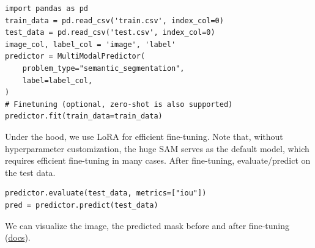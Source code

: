 \begin{verbatim}
import pandas as pd
train_data = pd.read_csv('train.csv', index_col=0)
test_data = pd.read_csv('test.csv', index_col=0)
image_col, label_col = 'image', 'label'
predictor = MultiModalPredictor(
    problem_type="semantic_segmentation", 
    label=label_col,
)
# Finetuning (optional, zero-shot is also supported)
predictor.fit(train_data=train_data)
\end{verbatim}

Under the hood, we use LoRA for efficient fine-tuning. Note that, without hyperparameter customization, the huge SAM serves as the default model, which requires efficient fine-tuning in many cases. After fine-tuning, evaluate/predict on the test data.

\begin{verbatim}
predictor.evaluate(test_data, metrics=["iou"])
pred = predictor.predict(test_data)
\end{verbatim}

We can visualize the image, the predicted mask before and after fine-tuning (\href{https://auto.gluon.ai/stable/tutorials/multimodal/image_segmentation/beginner_semantic_seg.html}{docs}).

